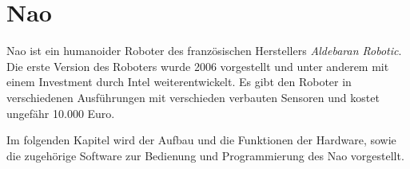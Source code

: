 \chapter{Nao}
Nao ist ein humanoider Roboter des französischen Herstellers \textit{Aldebaran Robotic}. Die erste Version des Roboters wurde 2006 vorgestellt und unter anderem mit einem Investment durch Intel weiterentwickelt. Es gibt den Roboter in verschiedenen Ausführungen mit verschieden verbauten Sensoren und kostet ungefähr 10.000 Euro. \cite{ws:wikinao}

Im folgenden Kapitel wird der Aufbau und die Funktionen der Hardware, sowie die zugehörige Software zur Bedienung und Programmierung des Nao vorgestellt.




